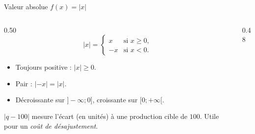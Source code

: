 \documentclass[10pt,aspectratio=169]{beamer}
\numberwithin{dummy}{section}
\begin{document}
\begin{frame}{Valeur absolue $f(x)=|x|$}
\begin{columns}[T]
\begin{column}{0.50\textwidth}
\[
|x|=\begin{cases}
x & \text{si }x\geqslant 0,\\
-x & \text{si }x<0.
\end{cases}
\]
\begin{itemize}
    \item Toujours positive : $|x|\geqslant 0$.
    \item Pair : $|-x|=|x|$.
    \item Décroissante sur $]{-}\infty;0]$, croissante sur $[0;+\infty[$.
\end{itemize}
\vspace{0.3em}
\begin{boxgestion}
$|q-100|$ mesure l'écart (en unités) à une production cible de $100$.
Utile pour un \emph{coût de désajustement}.
\end{boxgestion}
\end{column}
\begin{column}{0.48\textwidth}
\centering
{}
\end{column}
\end{columns}
\end{frame}
\end{document}
